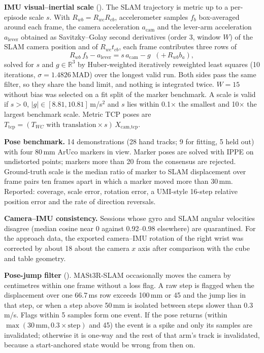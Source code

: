 \documentclass[conference,10pt]{IEEEtran}
\newcommand{\mm}{\,mm\xspace}
\begin{document}
\textbf{IMU visual--inertial scale} (). The SLAM trajectory is metric up to a per-episode scale $s$.
With $R_{wb}=R_{wc}R_{cb}$, accelerometer samples $f_b$ box-averaged around each frame, the camera acceleration $a_\text{cam}$ and
the lever-arm acceleration $a_\text{lever}$ obtained as Savitzky--Golay second derivatives (order 3, window $W$) of the SLAM camera
position and of $R_{wc}t_{cb}$, each frame contributes three rows of
\begin{equation}
R_{wb}\,f_b - a_\text{lever} = s\,a_\text{cam} - g\;\;(+\,R_{wb}b_a),
\end{equation}
solved for $s$ and $g\in\mathbb{R}^3$ by Huber-weighted iteratively reweighted least squares (10 iterations, $\sigma=1.4826\,$MAD)
over the longest valid run. Both sides pass the same filter, so they share the band limit, and nothing is integrated twice.
$W=15$ without bias was selected on a fit split of the marker benchmark. A scale is valid if $s>0$, $|g|\in[8.81,10.81]$\,m/s$^2$
and $s$ lies within 0.1$\times$ the smallest and 10$\times$ the largest benchmark scale. Metric TCP poses are $T_\text{tcp}=
(T_{WC}\text{ with translation}\times s)\,X_\text{cam,tcp}$.

\textbf{Pose benchmark.} 14 demonstrations (28 hand tracks; 9 for fitting, 5 held out) with four 80\mm ArUco markers in view.
Marker poses are solved with IPPE on undistorted points; markers more than 20\textdegree{} from the consensus are rejected.
Ground-truth scale is the median ratio of marker to SLAM displacement over frame pairs ten frames apart in which a marker moved
more than 30\mm. Reported: coverage, scale error, rotation error, a UMI-style 16-step relative position error and the rate of
direction reversals.

\textbf{Camera--IMU consistency.} Sessions whose gyro and SLAM angular velocities disagree (median cosine near 0 against
0.92--0.98 elsewhere) are quarantined. For the approach data, the exported camera--IMU rotation of the right wrist was corrected by
about 18\textdegree{} about the camera $x$ axis after comparison with the cube and table geometry.

\textbf{Pose-jump filter} (). MASt3R-SLAM occasionally moves the camera by
centimetres within one frame without a loss flag. A raw step is flagged when the displacement over one 66.7\,ms row exceeds 100\mm{}
or 45\textdegree{} and the jump lies in that step, or when a step above 50\mm is isolated between steps slower than 0.3\,m/s.
Flags within 5 samples form one event. If the pose returns (within $\max(30\,\text{mm}, 0.3\times\text{step})$ and 45\textdegree)
the event is a spike and only its samples are invalidated; otherwise it is one-way and the rest of that arm's track is
invalidated, because a start-anchored state would be wrong from then on.
\end{document}
